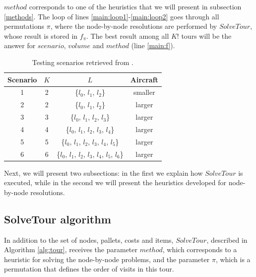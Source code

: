 \documentclass[preprint,authoryear]{elsarticle}
\begin{document}
$method$\/ corresponds to one of the heuristics that we will present in subsection \ref{methods}. The loop of lines \ref{main:loop1}-\ref{main:loop2} goes through all permutations $\pi$, where the node-by-node resolutions are performed by $SolveTour$, whose result is stored in $f_{\pi}$. The best result among all $K!$\/ tours will be the answer for $scenario$, $volume$\/ and $method$\/ (line \ref{main:f}). 

\vspace{2.0mm}
\begin{table}[H]
	\centering
	\caption{Testing scenarios retrieved from \cite{MesquitaSanches2023}.}  \label{tab:scenarios}
	\begin{tabular}{c c c c }
		\toprule
		{\bf Scenario} & {$K$} & {$L$} & {\bf Aircraft} \\		
		\midrule
		1 & 2    & \{$l_0$, $l_1$, $l_2$\}                                 & smaller \\
		2 & 2    & \{$l_0$, $l_1$, $l_2$\}                                 & larger  \\
		3 & 3    & \{$l_0$, $l_1$, $l_2$, $l_3$\}                          & larger  \\
		4 & 4    & \{$l_0$, $l_1$, $l_2$, $l_3$, $l_4$\}                   & larger  \\
		5 & 5    & \{$l_0$, $l_1$, $l_2$, $l_3$, $l_4$, $l_5$\}            & larger  \\
		6 & 6    & \{$l_0$, $l_1$, $l_2$, $l_3$, $l_4$, $l_5$, $l_6$\}     & larger  \\
		\bottomrule
	\end{tabular}
\end{table}

Next, we will present two subsections: in the first we explain how $SolveTour$ is executed, while in the second we will present the heuristics developed for node-by-node resolutions.


\subsection{SolveTour algorithm}
\label{tour}

In addition to the set of nodes, pallets, costs and items, $SolveTour$, described in Algorithm \ref{alg:tour}, receives the parameter $method$, which corresponds to a heuristic for solving the node-by-node problems, and the parameter $\pi$, which is a permutation that defines the order of visits in this tour.
\end{document}
